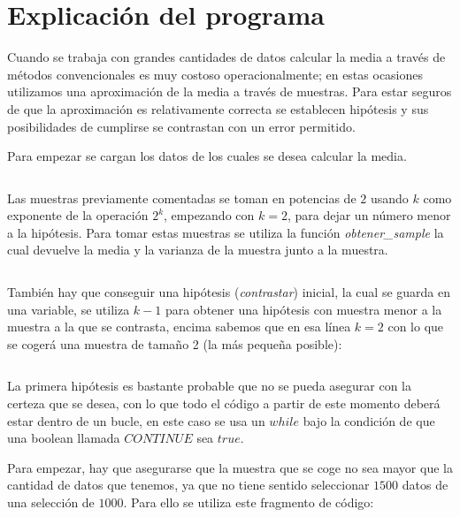 
\section{Explicación del programa}



Cuando se trabaja con grandes cantidades de datos calcular la media a través de métodos convencionales es muy costoso operacionalmente; en estas ocasiones utilizamos una aproximación de la media a través de muestras. Para estar seguros de que la aproximación es relativamente correcta se establecen hipótesis y sus posibilidades de cumplirse se contrastan con un error permitido.

\medskip
Para empezar se cargan los datos de los cuales se desea calcular la media.

\inputminted[firstline=7, lastline=9]{R}{../R/media.R}

Las muestras previamente comentadas se toman en potencias de $2$ usando $k$ como exponente de la operación $2^k$, empezando con $k = 2$, para dejar un número menor a la hipótesis. Para tomar estas muestras se utiliza la función \textit{obtener\_sample} la cual devuelve la media y la varianza de la muestra junto a la muestra.

\inputminted[firstline=2, lastline=7]{R}{../R/dependencias.R}

También hay que conseguir una hipótesis (\textit{contrastar}) inicial, la cual se guarda en una variable, se utiliza $k-1$ para obtener una hipótesis con muestra menor a la muestra a la que se contrasta, encima sabemos que en esa línea $k=2$ con lo que se cogerá una muestra de tamaño 2 (la más pequeña posible):

\inputminted[firstline=14, lastline=14]{R}{../R/media.R}

La primera hipótesis es bastante probable que no se pueda asegurar con la certeza que se desea, con lo que todo el código a partir de este momento deberá estar dentro de un bucle, en este caso se usa un $while$ bajo la condición de que una boolean llamada $CONTINUE$ sea $true$.

\medskip
Para empezar, hay que asegurarse que la muestra que se coge no sea mayor que la cantidad de datos que tenemos, ya que no tiene sentido seleccionar $1500$ datos de una selección de $1000$. Para ello se utiliza este fragmento de código:

